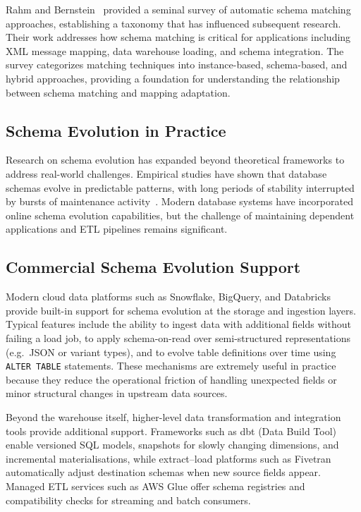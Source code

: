 Rahm and Bernstein~\cite{rahm2001survey} provided a seminal survey of automatic schema matching approaches, establishing a taxonomy that has influenced subsequent research. Their work addresses how schema matching is critical for applications including XML message mapping, data warehouse loading, and schema integration. The survey categorizes matching techniques into instance-based, schema-based, and hybrid approaches, providing a foundation for understanding the relationship between schema matching and mapping adaptation.

\subsection{Schema Evolution in Practice}

Research on schema evolution has expanded beyond theoretical frameworks to address real-world challenges. Empirical studies have shown that database schemas evolve in predictable patterns, with long periods of stability interrupted by bursts of maintenance activity~\cite{curino2008schema}. Modern database systems have incorporated online schema evolution capabilities, but the challenge of maintaining dependent applications and ETL pipelines remains significant.

\subsection{Commercial Schema Evolution Support}
\label{sec:related-commercial-evolution}

Modern cloud data platforms such as Snowflake, BigQuery, and Databricks provide built-in support for schema evolution at the storage and ingestion layers. Typical features include the ability to ingest data with additional fields without failing a load job, to apply schema-on-read over semi-structured representations (e.g.\ JSON or variant types), and to evolve table definitions over time using \texttt{ALTER TABLE} statements. These mechanisms are extremely useful in practice because they reduce the operational friction of handling unexpected fields or minor structural changes in upstream data sources.

Beyond the warehouse itself, higher-level data transformation and integration tools provide additional support. Frameworks such as dbt (Data Build Tool) enable versioned SQL models, snapshots for slowly changing dimensions, and incremental materialisations, while extract--load platforms such as Fivetran automatically adjust destination schemas when new source fields appear. Managed ETL services such as AWS Glue offer schema registries and compatibility checks for streaming and batch consumers.

